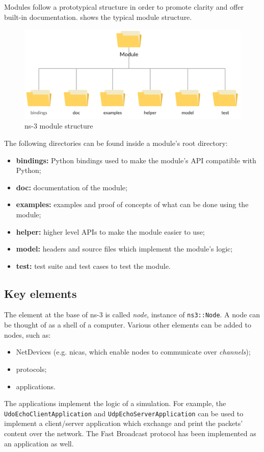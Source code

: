		
		Modules follow a prototypical structure in order to promote clarity and offer built-in documentation.  shows the typical module structure.
		
		\begin{figure}[H]
			\centering
			\includegraphics[width=\textwidth]{immagini/ns-3-module}
			\caption{ns-3 module structure}
			\label{fig:ns-3-module}
		\end{figure}
		
		The following directories can be found inside a module's root directory:
		\begin{itemize}
			\item \textbf{bindings:} Python bindings used to make the module's API compatible with Python;
			\item \textbf{doc:} documentation of the module;
			\item \textbf{examples:} examples and proof of concepts of what can be done using the module;
			\item \textbf{helper:} higher level APIs to make the module easier to use;
			\item \textbf{model:} headers and source files which implement the module's logic; 
			\item \textbf{test:} test suite and test cases to test the module.
		\end{itemize}
	
		\subsection{Key elements}
			The element at the base of ns-3 is called \textit{node}, instance of \texttt{ns3::Node}. A node can be thought of as a shell of a computer. Various other elements can be added to nodes, such as:
			\begin{itemize}
				\item NetDevices (e.g. \acrshort{nica}s, which enable nodes to communicate over \textit{channels});
				\item protocols;
				\item applications. 
			\end{itemize}
			The applications implement the logic of a simulation. For example, the \texttt{UdoEchoClientApplication} and \texttt{UdpEchoServerApplication} can be used to implement a client/server application which exchange and print the packets' content over the network. The Fast Broadcast protocol has been implemented as an application as well.
			
